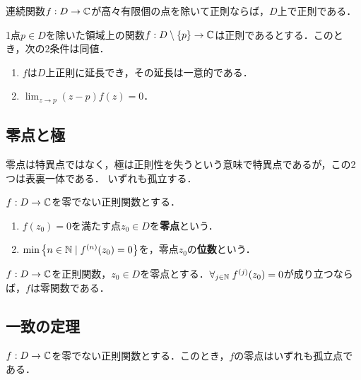 \documentclass[uplatex, dvipdfmx]{jsreport}
\begin{document}
\begin{corollary}[連続性による除去]
    連続関数$f:D\to\mathbb{C}$が高々有限個の点を除いて正則ならば，$D$上で正則である．
\end{corollary}

\begin{corollary}[除去可能特異点の特徴付け]
    1点$p\in D$を除いた領域上の関数$f:D\setminus\{p\}\to\mathbb{C}$は正則であるとする．このとき，次の2条件は同値．
    \begin{enumerate}
        \item $f$は$D$上正則に延長でき，その延長は一意的である．
        \item $\lim_{z\to p}(z-p)f(z)=0$．
    \end{enumerate}
\end{corollary}

\subsection{零点と極}

\begin{tcolorbox}[colframe=ForestGreen, colback=ForestGreen!10!white,breakable,colbacktitle=ForestGreen!40!white,coltitle=black,fonttitle=\bfseries\sffamily,
title=]
    零点は特異点ではなく，極は正則性を失うという意味で特異点であるが，この2つは表裏一体である．
    いずれも孤立する．
\end{tcolorbox}

\begin{definition}
    $f:D\to\mathbb{C}$を零でない正則関数とする．
    \begin{enumerate}
        \item $f(z_0)=0$を満たす点$z_0\in D$を\textbf{零点}という．
        \item $\min\left\{n\in\mathbb{N}\mid f^{(n)}(z_0)=0\right\}$を，零点$z_0$の\textbf{位数}という．
    \end{enumerate}
\end{definition}

\begin{proposition}[位数は有限である]
    $f:D\to\mathbb{C}$を正則関数，$z_0\in D$を零点とする．$\forall_{j\in\mathbb{N}}\;f^{(j)}(z_0)=0$が成り立つならば，$f$は零関数である．
\end{proposition}

\subsection{一致の定理}

\begin{theorem}
    $f:D\to\mathbb{C}$を零でない正則関数とする．このとき，$f$の零点はいずれも孤立点である．
\end{theorem}
\end{document}
